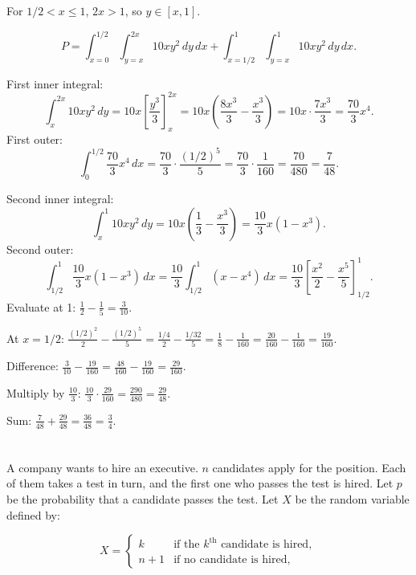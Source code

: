\documentclass[12pt]{article}
\begin{document}
\begin{answerbox}
\begin{enumerate}
For \(1/2 < x \leq 1\), \(2x > 1\), so \(y \in [x, 1]\).

\[
P = \int_{x=0}^{1/2} \int_{y=x}^{2x} 10 x y^2 \, dy \, dx + \int_{x=1/2}^{1} \int_{y=x}^{1} 10 x y^2 \, dy \, dx.
\]

First inner integral:
\[
\int_{x}^{2x} 10 x y^2 \, dy = 10 x \left[ \frac{y^3}{3} \right]_{x}^{2x} = 10 x \left( \frac{8x^3}{3} - \frac{x^3}{3} \right) = 10 x \cdot \frac{7x^3}{3} = \frac{70}{3} x^4.
\]
First outer:
\[
\int_{0}^{1/2} \frac{70}{3} x^4 \, dx = \frac{70}{3} \cdot \frac{(1/2)^5}{5} = \frac{70}{3} \cdot \frac{1}{160} = \frac{70}{480} = \frac{7}{48}.
\]

Second inner integral:
\[
\int_{x}^{1} 10 x y^2 \, dy = 10 x \left( \frac{1}{3} - \frac{x^3}{3} \right) = \frac{10}{3} x (1 - x^3).
\]
Second outer:
\[
\int_{1/2}^{1} \frac{10}{3} x (1 - x^3) \, dx = \frac{10}{3} \int_{1/2}^{1} (x - x^4) \, dx = \frac{10}{3} \left[ \frac{x^2}{2} - \frac{x^5}{5} \right]_{1/2}^{1}.
\]
Evaluate at 1: \(\frac{1}{2} - \frac{1}{5} = \frac{3}{10}\).  

At \(x=1/2\): \(\frac{(1/2)^2}{2} - \frac{(1/2)^5}{5} = \frac{1/4}{2} - \frac{1/32}{5} = \frac{1}{8} - \frac{1}{160} = \frac{20}{160} - \frac{1}{160} = \frac{19}{160}\).  

Difference: \(\frac{3}{10} - \frac{19}{160} = \frac{48}{160} - \frac{19}{160} = \frac{29}{160}\).  

Multiply by \(\frac{10}{3}\): \(\frac{10}{3} \cdot \frac{29}{160} = \frac{290}{480} = \frac{29}{48}\).

Sum: \(\frac{7}{48} + \frac{29}{48} = \frac{36}{48} = \frac{3}{4}\).
\end{enumerate}
\end{answerbox}

\section{}
A company wants to hire an executive. \( n \) candidates apply for the position. Each of them takes a test in turn, and the first one who passes the test is hired. Let \( p \) be the probability that a candidate passes the test. Let \( X \) be the random variable defined by:

\[
X = 
\begin{cases} 
k & \text{if the } k^{\text{th}} \text{ candidate is hired}, \\
n + 1 & \text{if no candidate is hired},
\end{cases}
\]
\end{document}
